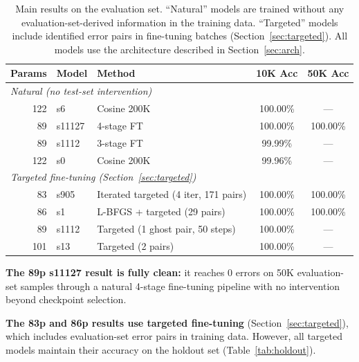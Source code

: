 \documentclass[11pt]{article}
\begin{document}
\begin{table}[t]
\centering
\caption{Main results on the evaluation set. ``Natural''
models are trained without any evaluation-set-derived information in the
training data. ``Targeted'' models include identified error pairs in
fine-tuning batches (Section~\ref{sec:targeted}). All models use the
architecture described in Section~\ref{sec:arch}.}
\label{tab:main}
\vspace{4pt}
\small
\begin{tabular}{@{}rllcc@{}}
\toprule
Params & Model & Method & 10K Acc & 50K Acc \\
\midrule
\multicolumn{5}{l}{\textit{Natural (no test-set intervention)}} \\
122 & s6      & Cosine 200K       & 100.00\% & ---      \\
89  & s11127  & 4-stage FT        & 100.00\% & 100.00\% \\
89  & s1112   & 3-stage FT        &  99.99\% & ---      \\
122 & s0      & Cosine 200K       &  99.96\% & ---      \\
\midrule
\multicolumn{5}{l}{\textit{Targeted fine-tuning (Section~\ref{sec:targeted})}} \\
83  & s905    & Iterated targeted (4 iter, 171 pairs) & 100.00\% & 100.00\% \\
86  & s1      & L-BFGS + targeted (29 pairs)          & 100.00\% & 100.00\% \\
89  & s1112   & Targeted (1 ghost pair, 50 steps)     & 100.00\% & ---      \\
101 & s13     & Targeted (2 pairs)                    & 100.00\% & ---      \\
\bottomrule
\end{tabular}
\end{table}

\textbf{The 89p s11127 result is fully clean:} it reaches 0 errors on
50K evaluation-set samples through a natural 4-stage fine-tuning pipeline
with no intervention beyond checkpoint selection.

\textbf{The 83p and 86p results use targeted fine-tuning} (Section~\ref{sec:targeted}),
which includes evaluation-set error pairs in training data. However,
all targeted models maintain their accuracy on the holdout set
(Table~\ref{tab:holdout}).
\end{document}

